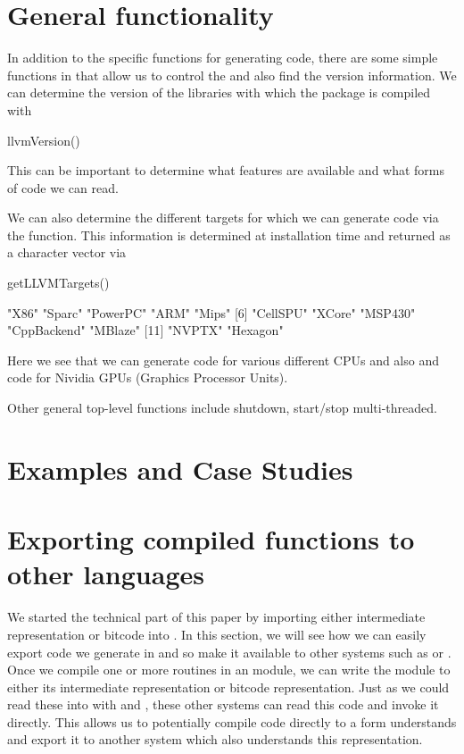 \documentclass[article]{jss}
\def\Rllvm{\Rpkg{Rllvm}}
\def\IR{intermediate representation}
\begin{document}

\section[General LLVM functionality]{General \llvm{} functionality}

In addition to the specific functions for generating code,
there are some simple functions in \Rllvm{} that
allow us to control the \llvm{} and also find the
version information.
We can determine the version of the \llvm{} libraries
with which the \R{} package is compiled with
\begin{RCode}
llvmVersion()  
\end{RCode}
This can be important to determine what features are available
and what forms of code we can read.


We can also determine the different targets 
for which we can generate  code via the 
function. This information is determined at installation time
and returned as a character vector  via 
\begin{RCode}
getLLVMTargets()
\end{RCode}
\begin{ROutput}
 [1] "X86"        "Sparc"      "PowerPC"    "ARM"        "Mips"      
 [6] "CellSPU"    "XCore"      "MSP430"     "CppBackend" "MBlaze"    
[11] "NVPTX"      "Hexagon"     
\end{ROutput}
Here we see that we can generate code for various different CPUs
and also \Cpp{} and  code for  Nividia GPUs (Graphics
Processor Units).

Other general top-level functions include 
shutdown, start/stop multi-threaded.

\section{Examples and Case Studies}


\section[Exporting compiled R functions to other languages]{Exporting compiled \R{} functions to other languages}

We started the technical part of this paper by importing either \IR{}
or bitcode into \R.  In this section, we will see how we can easily
export code we generate in \R{} and so make it available to other
systems such as \Python{} or \Matlab.  Once we compile one or more
routines in an \llvm{} module, we can write the module to either its
\IR{} or bitcode representation.  Just as we could read these into
\R{} with  and , these other systems
can read this code and invoke it directly.  This allows us to
potentially compile \R{} code directly to a form \llvm{} understands
and export it to another system which also understands this \llvm{}
representation.
\end{document}
